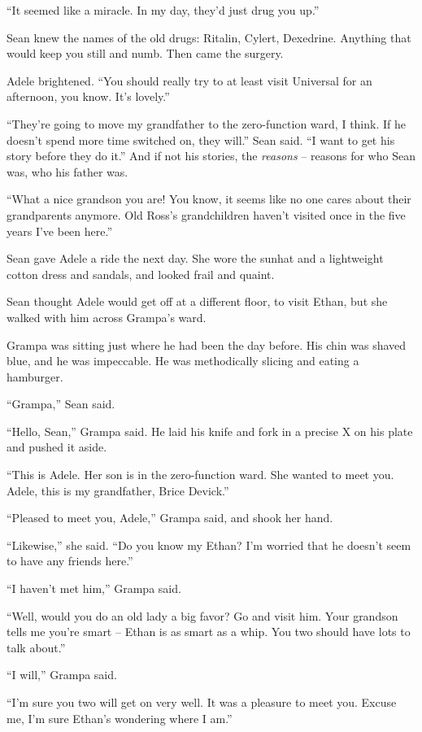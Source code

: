 “It seemed like a miracle. In my day, they'd just drug you up.”

Sean knew the names of the old drugs: Ritalin, Cylert, Dexedrine. 
Anything that would keep you still and numb. Then came the surgery.

Adele brightened. “You should really try to at least visit Universal 
for an afternoon, you know. It's lovely.”

“They're going to move my grandfather to the zero-function ward, I 
think. If he doesn't spend more time switched on, they will.” Sean 
said. “I want to get his story before they do it.” And if not his 
stories, the \emph{reasons} -- reasons for who Sean was, who his father 
was.

“What a nice grandson you are! You know, it seems like no one cares 
about their grandparents anymore. Old Ross's grandchildren haven't 
visited once in the five years I've been here.”

\tb

Sean gave Adele a ride the next day. She wore the sunhat and a 
lightweight cotton dress and sandals, and looked frail and quaint.

Sean thought Adele would get off at a different floor, to visit Ethan, 
but she walked with him across Grampa's ward.

Grampa was sitting just where he had been the day before. His chin was 
shaved blue, and he was impeccable. He was methodically slicing and 
eating a hamburger.

“Grampa,” Sean said.

“Hello, Sean,” Grampa said. He laid his knife and fork in a precise 
X on his plate and pushed it aside.

“This is Adele. Her son is in the zero-function ward. She wanted to 
meet you. Adele, this is my grandfather, Brice Devick.”

“Pleased to meet you, Adele,” Grampa said, and shook her hand.

“Likewise,” she said. “Do you know my Ethan? I'm worried that he 
doesn't seem to have any friends here.”

“I haven't met him,” Grampa said.

“Well, would you do an old lady a big favor? Go and visit him. Your 
grandson tells me you're smart -- Ethan is as smart as a whip. You two 
should have lots to talk about.”

“I will,” Grampa said.

“I'm sure you two will get on very well. It was a pleasure to meet 
you. Excuse me, I'm sure Ethan's wondering where I am.”


